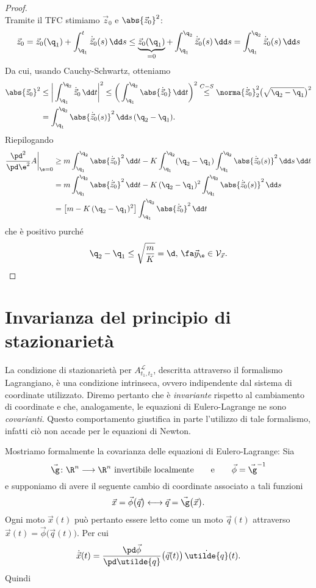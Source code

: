 \begin{proof}
\[	\]
	Tramite il TFC stimiamo \(\vec{z}_0\) e \(\abs{\vec{z}_0}^2\):
	\[
		\vec{z}_0 = \vec{z}_0(\q_1) + \int_{\q_1}^t \dot{\vec{z}}_0(s)\,\dd s \le \underbrace{\vec{z}_0(\q_1)}_{=0} + \int_{\q_1}^{\q_2} \dot{\vec{z}}_0(s)\,\dd s = \int_{\q_1}^{\q_2} \dot{\vec{z}}_0(s)\,\dd s
	\]
	Da cui, usando Cauchy-Schwartz, otteniamo
	\[
		\begin{split}
			\abs{\vec{z}_0}^2 & \le \bigg\lvert \int_{\q_1}^{\q_2} \dot{\vec{z}}_0\,\dd t \bigg\rvert^2 \le \bigg(\int_{\q_1}^{\q_2} \abs{\dot{\vec{z}}_0}\,\dd t\bigg)^2 \overset{C-S}{\le} \norma{\dot{\vec{z}}_0}_2^2 \big(\sqrt{\q_2-\q_1}\big)^2\\
			& = \int_{\q_1}^{\q_2} \abs{\dot{\vec{z}}_0(s)}^2\,\dd s\, (\q_2-\q_1).
		\end{split}
	\]
	Riepilogando
	\[
		\begin{split}
			\frac{\pd^2}{\pd\e^2} A\bigg|_{\e=0} & \ge m\int_{\q_1}^{\q_2}\abs{\dot{\vec{z}}_0}^2\,\dd t - K\int_{\q_1}^{\q_2}(\q_2-\q_1)\int_{\q_1}^{\q_2} \abs{\dot{\vec{z}}_0(s)}^2\,\dd s\,\dd t\\
			& = m\int_{\q_1}^{\q_2}\abs{\dot{\vec{z}}_0}^2\,\dd t- K\,(\q_2-\q_1)^2 \int_{\q_1}^{\q_2} \abs{\dot{\vec{z}}_0(s)}^2\,\dd s\\
			& = \big[m-K\,(\q_2-\q_1)^2\big]\int_{\q_1}^{\q_2} \abs{\dot{\vec{z}}_0}^2\,\dd t
		\end{split}
	\]
	che è positivo purché
	\[
		\q_2-\q_1 \le \sqrt{\frac{m}{K}} = \d,\,\fa \vec{y}_\e \in \mathcal{V}_{\vec{x}}.\qedhere
	\]
\end{proof}
%
%
\section{Invarianza del principio di stazionarietà}

La condizione di stazionarietà per \(A_{t_1,t_2}^{\mathcal{L}}\), descritta attraverso il formalismo Lagrangiano, è una condizione intrinseca, ovvero indipendente dal sistema di coordinate utilizzato. Diremo pertanto che è \emph{invariante} rispetto al cambiamento di coordinate e che, analogamente, le equazioni di Eulero-Lagrange ne sono \emph{covarianti}.
Questo comportamento giustifica in parte l'utilizzo di tale formalismo, infatti ciò non accade per le equazioni di Newton.

Mostriamo formalmente la covarianza delle equazioni di Eulero-Lagrange:
Sia
\[
	\vec{\g}\colon \R^n \longrightarrow \R^n \text{ invertibile localmente} \qquad\text{e}\qquad \vec{\phi} = \vec{\g}^{-1}
\]
e supponiamo di avere il seguente cambio di coordinate associato a tali funzioni
\[
	\vec{x} = \vec{\phi}\big(\vec{q}\big) \longleftrightarrow \vec{q} = \vec{\g}\big(\vec{x}\big).
\]
Ogni moto \(\vec{x}(t)\) può pertanto essere letto come un moto \(\vec{q}(t)\) attraverso \(\vec{x}(t) = \vec{\phi}\big(\vec{q}(t)\big)\). Per cui
\[
	\dot{\vec{x}}(t) = \frac{\pd\vec{\phi}}{\pd\utilde{q}}\big(\vec{q}(t)\big)\,\dot{\utilde{q}}(t).
\]
Quindi

